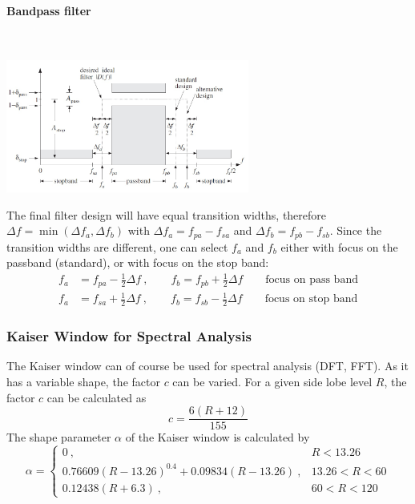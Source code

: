 \paragraph{Bandpass filter}~\\
\begin{center}
	\includegraphics[width=8cm]{images/FIR_KaiserBP.jpg}
\end{center}
The final filter design will have equal transition widths, therefore 
$\Delta f = \min(\Delta f_a, \Delta f_b)$ with $\Delta f_a=f_{pa}-f_{sa}$ 
and $\Delta f_b=f_{pb}-f_{sb}$.
Since the transition widths are different, one can select $f_a$ and $f_b$ either
with focus on the passband (standard), or with focus on the stop band:
\begin{align*}
	f_a &= f_{pa} - \frac{1}{2} \Delta f \:, \qquad f_b = f_{pb} + \frac{1}{2} \Delta f \qquad \text{focus on pass band}\\
	f_a &= f_{sa} + \frac{1}{2} \Delta f \:, \qquad f_b = f_{sb} - \frac{1}{2} \Delta f \qquad \text{focus on stop band}
\end{align*}

\subsubsection{Kaiser Window for Spectral Analysis}
The Kaiser window can of course be used for spectral analysis (DFT, FFT). As it
has a variable shape, the factor $c$ can be varied. For a given side lobe level
$R$, the factor $c$ can be calculated as
\begin{equation*}
	c = \frac{6 \left(R + 12\right)}{155}
\end{equation*} 
The shape parameter $\alpha$ of the Kaiser window is calculated by
\begin{equation*}
	\alpha = \begin{cases}
		0\:, & R < 13.26 \\
		0.76609(R-13.26)^{0.4}+0.09834(R-13.26)\:, & 13.26 < R < 60 \\
		0.12438 (R+6.3)\:, & 60 < R < 120
	\end{cases}
\end{equation*}

